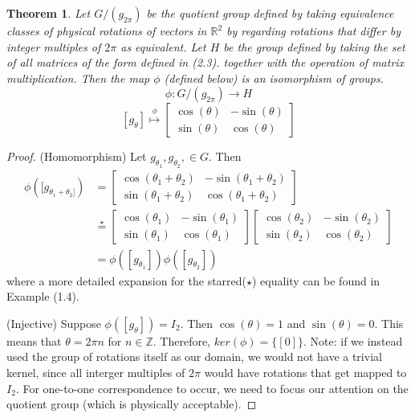 \documentclass[10pt]{ucthesis}
\newcommand{\Z}{\mathbb{Z}}
\newcommand{\R}{\mathbb{R}}
\newtheorem{theorem}[definition]{Theorem}
\begin{document}
\begin{theorem}
	Let $G/(g_{2\pi})$ be the quotient group defined by taking equivalence classes of physical rotations of vectors in $\R^2$ by regarding rotations that differ by integer multiples of $2\pi$ as equivalent. Let $H$ be the group defined by taking the set of all matrices of the form defined in (2.3). together with the operation of matrix multiplication. Then the map $\phi$ (defined below) is an isomorphism of groups.
$$\phi:G/(g_{2\pi})\rightarrow H$$
$$[g_\theta] \overset{\phi}{\mapsto} \begin{bmatrix}
			\cos(\theta) & -\sin(\theta) \\
			\sin(\theta) & \cos(\theta)
		\end{bmatrix}$$
\end{theorem}
\noindent\begin{proof} 

(Homomorphism) Let $g_{\theta_1},g_{\theta_2},\in G$. Then 
\begin{equation}
	\begin{aligned}
		\phi([g_{\theta_1+\theta_2]}) &= \begin{bmatrix}
			\cos(\theta_1+\theta_2) & -\sin(\theta_1+\theta_2) \\
			\sin(\theta_1+\theta_2) & \cos(\theta_1+\theta_2)
		\end{bmatrix} \\
		&\overset{\star}{=} \begin{bmatrix}
			\cos(\theta_1) & -\sin(\theta_1) \\
			\sin(\theta_1) & \cos(\theta_1)
		\end{bmatrix}
		\begin{bmatrix}
			\cos(\theta_2) & -\sin(\theta_2) \\
			\sin(\theta_2) & \cos(\theta_2)
		\end{bmatrix}\\
		&= \phi([g_{\theta_1}])\phi([g_{\theta_2}])
	\end{aligned}
\end{equation}
where a more detailed expansion for the starred($\star$) equality can be found in Example (1.4).

(Injective) Suppose $\phi([g_\theta]) = I_2$. Then $\cos(\theta) = 1$ and $\sin(\theta) = 0$. This means that $\theta = 2\pi n$ for $n\in\Z$. Therefore, $ker(\phi) = \{[0]\}$. Note: if we instead used the group of rotations itself as our domain, we would not have a trivial kernel, since all interger multiples of $2\pi$ would have rotations that get mapped to $I_2$. For one-to-one correspondence to occur, we need to focus our attention on the quotient group (which is physically acceptable).


\end{proof}
\end{document}
